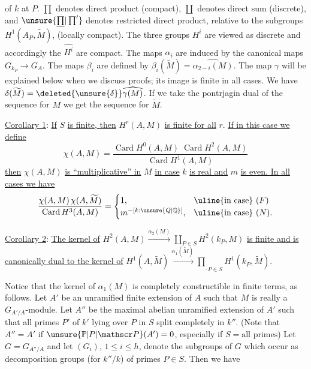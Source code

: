 of $k$ at $P$. $\prod$ denotes direct product (compact), $\coprod$ denotes direct sum (discrete), and $\unsure{\underline{\prod}|\prod'}$ denotes restricted direct product, relative to the subgroups $H^1(A_P,\widetilde M)$, (locally compact). The three groups $H^i$ are viewed as discrete and accordingly the $\widehat{H^i}$ are compact. The maps $\alpha_i$ are induced by the canonical maps $G_{k_P}\longrightarrow G_A$. The maps $\beta_i$ are defined by $\beta_i(\widetilde M)=\widehat{\alpha_{2-i}(M)}$. The map $\gamma$ will be explained below when we discuss proofs; its image is finite in all cases. We have $\delta(\widetilde M)=\deleted{\unsure{\delta}}\widehat{\gamma(M)}$. If we take the pontrjagin dual of the sequence for $M$ we get the sequence for $\widetilde M$.

\uline{Corollary 1}: \uline{If} $S$ \uline{is finite, then} $H^r(A,M)$ \uline{is finite for all} $r$. \uline{If in this case we define}
\[
\chi(A,M)=\frac{\operatorname{Card}H^0(A,M)\;\operatorname{Card}H^2(A,M)}{\operatorname{Card}H^1(A,M)}
\]
\uline{then} $\chi(A,M)$ \uline{is ``multiplicative'' in} $M$  \uline{in case} $k$ \uline{is real and} $m$ \uline{is even. In all cases we have}
\[
\frac{\chi(A,M)\,\chi(A,\widetilde M)}{\operatorname{Card}H^3(A,M)}=
\begin{cases}
1, & \text{\uline{in case} $(F)$}\\
m^{-[k:\unsure{Q|\mathbb Q}]}, & \text{\uline{in case} $(N)$}.
\end{cases}
\]

\uline{Corollary 2}: \uline{The kernel of} $H^2(A,M)\xrightarrow{\alpha_2(M)}\coprod_{P\in S}H^2(k_P,M)$ \uline{is finite and is canonically dual to the kernel of} $H^1(A,\widetilde M)\xrightarrow{\alpha_1(\widetilde M)}\underline{\prod}_{P\in S}H^1(k_P,\widetilde M)$.

Notice that the kernel of $\alpha_1(M)$ is completely constructible in finite terms, as follows. Let $A'$ be an unramified finite extension of $A$ such that $M$ is really a $G_{A'/A}$-module. Let $A''$ be the maximal abelian unramified extension of $A'$ such that all primes $P'$ of $k'$ lying over $P$ in $S$ split completely in $k''$. (Note that $A''=A'$ if $\unsure{\mathbb P|P|\mathscr P}(A')=0$, especially if $S=\text{all primes}$) Let $G=G_{A''/A}$ and let $(G_i)$, $1\leq i\leq h$, denote the subgroups of $G$ which occur as decomposition groups (for $k''/k$) of primes $P\in S$. Then we have

